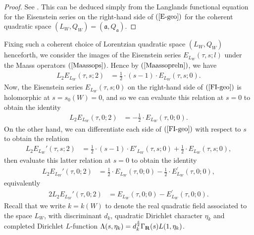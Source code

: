 \documentclass{amsart}
\theoremstyle{definition}
\theoremstyle{definition}
\theoremstyle{definition}
\begin{document}
\begin{proof} See \cite[Proposition 4.9]{VO}. This can be deduced simply from the Langlands functional equation for the 
Eisenstein series on the right-hand side of  $(\ref{E-geo})$ for the coherent quadratic space $(L_W, Q_W) = (\mathfrak{a}, Q_{\mathfrak{a}})$. \end{proof}

Fixing such a coherent choice of Lorentzian quadratic space $(L_W, Q_W)$ henceforth, we consider the images of the 
Eisenstein series $E_{L_W}(\tau, s; l)$ under the Maass operators $(\ref{Maassops})$. Hence by $(\ref{Maassopreln})$, we have 
\begin{align}\label{FI-geo} L_2 E_{L_W}(\tau, s; 2) &= \frac{1}{2} \cdot (s-1)\cdot E_{L_W}(\tau, s; 0). \end{align}
Now, the Eisenstein series $E_{L_W}(\tau, s; 0)$ on the right-hand side of $(\ref{FI-geo})$ is holomorphic at
$s = s_0(W) =0$, and so we can evaluate this relation at $s=0$ to obtain the identity 
\begin{align*} L_2 E_{L_W}(\tau, 0; 2) &= - \frac{1}{2} \cdot E_{L_W}(\tau, 0; 0). \end{align*}
On the other hand, we can differentiate each side of $(\ref{FI-geo})$ with respect to $s$ to obtain the relation
\begin{align*} L_2 E_{L_W}'(\tau, s; 2) &= \frac{1}{2} \cdot (s-1) \cdot E'_{L_W}(\tau, s; 0) + \frac{1}{2} \cdot E_{L_W}(\tau, s;0),\end{align*}
then evaluate this latter relation at $s=0$ to obtain the identity 
\begin{align*} L_2 E_{L_W}'(\tau, 0; 2) &= \frac{1}{2} \cdot E_{L_W}(\tau, 0;0) - \frac{1}{2} \cdot E^{\prime}_{L_W}(\tau, 0; 0), \end{align*}
equivalently 
\begin{align}\label{FI-geo2} 2 L_2 E_{L_W}'(\tau, 0; 2) &= E_{L_W}(\tau, 0;0) -  E^{\prime}_{L_W}(\tau, 0; 0). \end{align}
Recall that we write $k = k(W)$ to denote the real quadratic field associated to the space $L_W$, with discriminant $d_k$,
quadratic Dirichlet character $\eta_k$ and completed Dirichlet $L$-function $\Lambda(s, \eta_k) = d_k^{\frac{s}{2}}\Gamma_{\bf{R}}(s)L(1, \eta_k)$.
\end{document}
